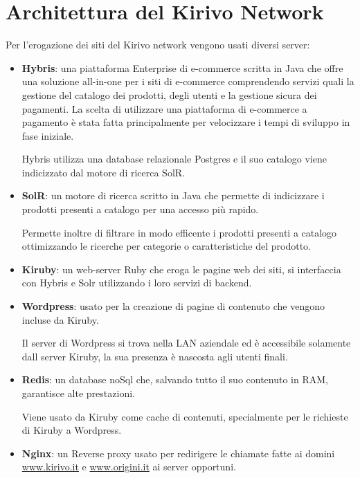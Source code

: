 \section{Architettura del Kirivo Network}
Per l'erogazione dei siti del Kirivo network vengono usati diversi server:
\begin{itemize}
\item {\bf Hybris}: una piattaforma Enterprise di e-commerce scritta in Java che offre una soluzione all-in-one per i siti 
di e-commerce comprendendo servizi quali la gestione del catalogo dei prodotti, degli utenti e la 
gestione sicura dei pagamenti. La scelta di utilizzare una piattaforma di e-commerce a pagamento è stata fatta
principalmente per velocizzare i tempi di sviluppo in fase iniziale.

Hybris utilizza una database relazionale Postgres e il suo catalogo viene indicizzato dal motore di ricerca SolR.

\item {\bf SolR}: un motore di ricerca scritto in Java che permette di indicizzare i prodotti presenti a catalogo per una accesso
più rapido.

Permette inoltre di filtrare in modo efficente i prodotti presenti a catalogo ottimizzando
le ricerche per categorie o caratteristiche del prodotto.

\item {\bf Kiruby}: un web-server Ruby che eroga le pagine web dei siti, si interfaccia con Hybris e Solr utilizzando i loro
servizi di backend. 
\item {\bf Wordpress}: usato per la creazione di pagine di contenuto che vengono incluse da Kiruby.

Il server di Wordpress si trova nella LAN aziendale ed è accessibile solamente dall server Kiruby, la sua
presenza è nascosta agli utenti finali.
\item {\bf Redis}: un database noSql che, salvando tutto il suo contenuto in RAM, garantisce alte prestazioni.

Viene usato da Kiruby come cache di contenuti, specialmente per le richieste di Kiruby a Wordpress.

\item {\bf Nginx}: un Reverse proxy usato per redirigere le chiamate fatte ai domini \url{www.kirivo.it} 
e \url{www.origini.it} ai server opportuni.
\end{itemize}

